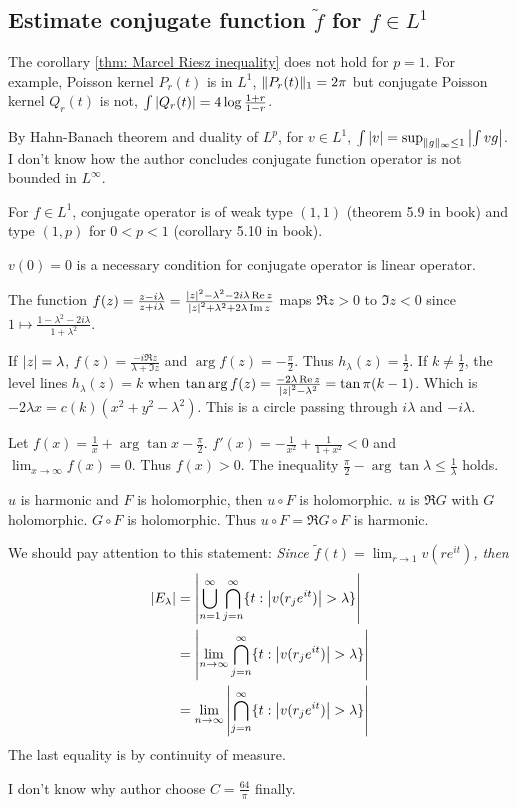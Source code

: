 \subsection{Estimate conjugate function $\tilde{f}$ for $f\in L^1$}
The corollary \ref{thm: Marcel Riesz inequality} does not hold for $p=1$. For example, Poisson kernel $P_r(t)$ is in $L^1$, $\lVert P_r(t)\rVert_1=2\pi$ but conjugate
Poisson kernel $Q_r(t)$ is not, $\int{\left\lvert Q_r(t)\right\rvert}=4\log{\frac{1+r}{1-r}}$.
\begin{remark}
    By Hahn-Banach theorem and duality of $L^p$, for $v\in L^1$, $\int{\left\lvert v\right\rvert}=\sup_{\lVert g\rVert_\infty\leq 1}{\left\lvert\int{vg}\right\rvert}$.
        {\color{blue}I don't know how the author concludes conjugate function operator is not bounded in $L^\infty$}.
\end{remark}
For $f\in L^1$, conjugate operator is of weak type $(1,1)$ (theorem 5.9 in book) and type $(1,p)$ for $0<p<1$ (corollary 5.10 in book).
\begin{remark}
    $v(0)=0$ is a necessary condition for conjugate operator is linear operator.\par
    The function $f(z)=\frac{z-i\lambda}{z+i\lambda}=\frac{\left\lvert z\right\rvert^2-\lambda^2-2i\lambda\operatorname{Re}{z}}{\left\lvert z\right\rvert^2+\lambda^2+2\lambda\operatorname{Im}{z}}$ maps $\Re{z}>0$ to {\color{red}$\Im{z}<0$} since $1\mapsto\frac{1-\lambda^2-2i\lambda}{1+\lambda^2}$.\par
    If $\left\lvert z\right\rvert=\lambda$, $f(z)=\frac{-i\Re{z}}{\lambda+\Im{z}}$ and $\arg{f(z)}=-\frac{\pi}{2}$. Thus $h_\lambda(z)=\frac{1}{2}$. If $k\neq \frac{1}{2}$, the level lines $h_\lambda(z)=k$ when $\tan\arg{f(z)}=\frac{-2\lambda\operatorname{Re}{z}}{\left\lvert z\right\rvert^2-\lambda^2}=\tan\pi(k-1)$. Which is $-2\lambda x=c(k)(x^2+y^2-\lambda^2)$. This is a circle passing through $i\lambda$ and $-i\lambda$.\par
    Let $f(x)=\frac{1}{x}+\arg{\tan{x}}-\frac{\pi}{2}$. $f'(x)=-\frac{1}{x^2}+\frac{1}{1+x^2}<0$ and $\lim_{x\to\infty}f(x)=0$. Thus $f(x)>0$. The inequality $\frac{\pi}{2}-\arg{\tan{\lambda}}\leq\frac{1}{\lambda}$ holds.\par
    $u$ is harmonic and $F$ is holomorphic, then $u\circ F$ is holomorphic. $u$ is $\Re{G}$ with $G$ holomorphic. $G\circ F$ is holomorphic. Thus $u\circ F=\Re{G\circ F}$ is harmonic.\par
    We should pay attention to this statement: \emph{Since $\tilde{f}(t)=\lim_{r\to 1}{v(re^{it})}$, then}
    \begin{align*}
        \left\lvert E_\lambda\right\rvert & =\left\lvert\bigcup_{n=1}^{\infty}\bigcap_{j=n}^{\infty}\{t:\left\lvert v(r_je^{it})\right\rvert>\lambda\}\right\rvert \\
                        & =\left\lvert\lim_{n\to\infty}\bigcap_{j=n}^{\infty}\{t:\left\lvert v(r_je^{it})\right\rvert>\lambda\}\right\rvert      \\
                        & =\lim_{n\to\infty}\left\lvert\bigcap_{j=n}^{\infty}\{t:\left\lvert v(r_je^{it})\right\rvert>\lambda\}\right\rvert
    \end{align*}
    The last equality is by continuity of measure.\par
    {\color{blue}I don't know why author choose $C=\frac{64}{\pi}$ finally}.
\end{remark}
